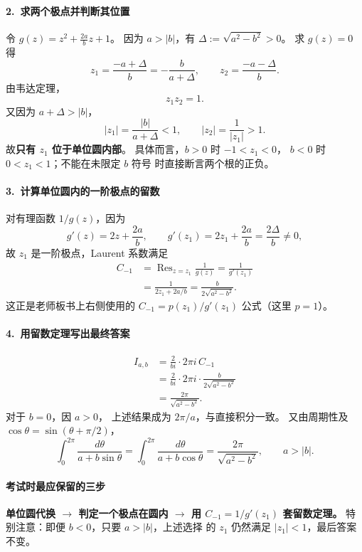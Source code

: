 \paragraph{2.\ 求两个极点并判断其位置}
令 $g(z)=z^2+\frac{2a}{b}z+1$。
因为 $a>|b|$，有
$\Delta:=\sqrt{a^2-b^2}>0$。
求 $g(z)=0$ 得
\[
  z_1=\frac{-a+\Delta}{b}
      =-\frac{b}{a+\Delta},
  \qquad
  z_2=\frac{-a-\Delta}{b}.
\]
由韦达定理，
\[
  z_1z_2=1.
\]
又因为 $a+\Delta>|b|$，
\[
  |z_1|=\frac{|b|}{a+\Delta}<1,
  \qquad
  |z_2|=\frac{1}{|z_1|}>1.
\]
故\textbf{只有 $z_1$ 位于单位圆内部}。
具体而言，$b>0$ 时 $-1<z_1<0$，
$b<0$ 时 $0<z_1<1$；不能在未限定 $b$ 符号
时直接断言两个根的正负。

\paragraph{3.\ 计算单位圆内的一阶极点的留数}
对有理函数 $1/g(z)$，因为
\[
  g'(z)=2z+\frac{2a}{b},
  \qquad
  g'(z_1)=2z_1+\frac{2a}{b}
          =\frac{2\Delta}{b}\ne0,
\]
故 $z_1$ 是一阶极点，Laurent 系数满足
\begin{align*}
 C_{-1}
 &=\operatorname{Res}_{z=z_1}\frac{1}{g(z)}
   =\frac{1}{g'(z_1)}\\
 &=\frac{1}{2z_1+2a/b}
   =\frac{b}{2\sqrt{a^2-b^2}}.
\end{align*}
这正是老师板书上右侧使用的
$C_{-1}=p(z_1)/g'(z_1)$ 公式（这里 $p=1$）。

\paragraph{4.\ 用留数定理写出最终答案}
\begin{align*}
 I_{a,b}
 &=\frac{2}{bi}\cdot 2\pi i\,C_{-1}\\
 &=\frac{2}{bi}\cdot 2\pi i
      \cdot\frac{b}{2\sqrt{a^2-b^2}}\\
 &=\boxed{\frac{2\pi}{\sqrt{a^2-b^2}}}.
\end{align*}
对于 $b=0$，因 $a>0$，
上述结果成为 $2\pi/a$，与直接积分一致。
又由周期性及 $\cos\theta=\sin(\theta+\pi/2)$，
\[
 \boxed{
 \int_0^{2\pi}\frac{d\theta}{a+b\sin\theta}
 =\int_0^{2\pi}\frac{d\theta}{a+b\cos\theta}
 =\frac{2\pi}{\sqrt{a^2-b^2}}
 },\qquad a>|b|.
\]

\paragraph{考试时最应保留的三步}
\textbf{单位圆代换 $\to$ 判定一个极点在圆内
$\to$ 用 $C_{-1}=1/g'(z_1)$ 套留数定理。}
特别注意：即便 $b<0$，只要 $a>|b|$，上述选择
的 $z_1$ 仍然满足 $|z_1|<1$，最后答案不变。


